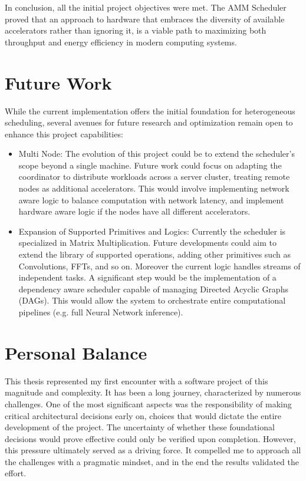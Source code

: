 In conclusion, all the initial project objectives were met. The AMM Scheduler proved that an approach to hardware that embraces the diversity of available accelerators rather than ignoring it, is a viable path to maximizing both throughput and energy efficiency in modern computing systems.

\section{Future Work}
While the current implementation offers the initial foundation for heterogeneous scheduling, several avenues for future research and optimization remain open to enhance this project capabilities:

\begin{itemize}
\item Multi Node: The evolution of this project could be to extend the scheduler's scope beyond a single machine. Future work could focus on adapting the coordinator to distribute workloads across a server cluster, treating remote nodes as additional accelerators. This would involve implementing network aware logic to balance computation with network latency, and implement hardware aware logic if the nodes have all different accelerators. 

\item Expansion of Supported Primitives and Logics: Currently the scheduler is specialized in Matrix Multiplication. Future developments could aim to extend the library of supported operations, adding other primitives such as Convolutions, FFTs, and so on. Moreover the current logic handles streams of independent tasks. A significant step would be the implementation of a dependency aware scheduler capable of managing Directed Acyclic Graphs (DAGs). This would allow the system to orchestrate entire computational pipelines  (e.g. full Neural Network inference).
\end{itemize}

\section{Personal Balance}
This thesis represented my first encounter with a software project of this magnitude and complexity. It has been a long journey, characterized by numerous challenges. One of the most significant aspects was the responsibility of making critical architectural decisions early on, choices that would dictate the entire development of the project. The uncertainty of whether these foundational decisions would prove effective could only be verified upon completion. 
However, this pressure ultimately served as a driving force. It compelled me to approach all the challenges with a pragmatic mindset, and in the end the results validated the effort.

